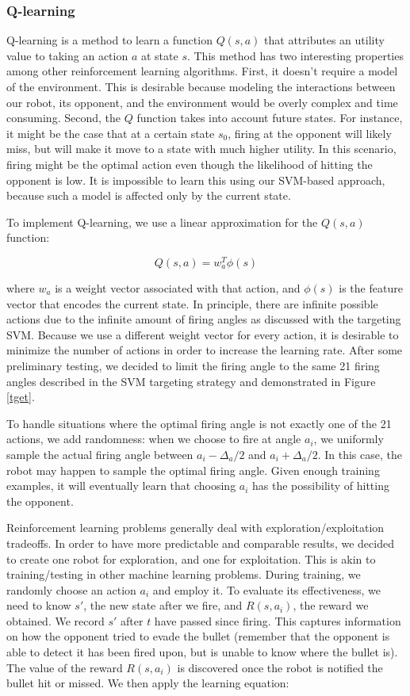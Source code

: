 \documentclass{article}
\theoremstyle{plain}
\theoremstyle{definition}
\theoremstyle{remark}
\begin{document}
\subsubsection*{Q-learning}
Q-learning \cite{watkins92a} is a method to learn a function $Q(s, a)$ that attributes an utility value to taking an action $a$ at state $s$. This method has two interesting properties among other reinforcement learning algorithms. First, it doesn't require a model of the environment. This is desirable because modeling the interactions between our robot, its opponent, and the environment would be overly complex and time consuming. Second, the $Q$ function takes into account future states. For instance, it might be the case that at a certain state $s_0$, firing at the opponent will likely miss, but will make it move to a state with much higher utility. In this scenario, firing might be the optimal action even though the likelihood of hitting the opponent is low. It is impossible to learn this using our SVM-based approach, because such a model is affected only by the current state.

To implement Q-learning, we use a linear approximation for the $Q(s, a)$ function:

$$Q(s, a) = w_a^T\phi(s)$$

where $w_a$ is a weight vector associated with that action, and $\phi(s)$ is the feature vector that encodes the current state. In principle, there are infinite possible actions due to the infinite amount of firing angles as discussed with the targeting SVM. Because we use a different weight vector for every action, it is desirable to minimize the number of actions in order to increase the learning rate. After some preliminary testing, we decided to limit the firing angle to the same 21 firing angles described in the SVM targeting strategy and demonstrated in Figure \ref{tget}.

To handle situations where the optimal firing angle is not exactly one of the 21 actions, we add randomness: when we choose to fire at angle $a_i$, we uniformly sample the actual firing angle between $a_i - \Delta_a/2$ and $a_i + \Delta_a/2$. In this case, the robot may happen to sample the optimal firing angle. Given enough training examples, it will eventually learn that choosing $a_i$ has the possibility of hitting the opponent.

Reinforcement learning problems generally deal with exploration/exploitation tradeoffs. In order to have more predictable and comparable results, we decided to create one robot for exploration, and one for exploitation. This is akin to training/testing in other machine learning problems. During training, we randomly choose an action $a_i$ and employ it. To evaluate its effectiveness, we need to know $s'$, the new state after we fire, and $R(s, a_i)$, the reward we obtained. We record $s'$ after $t$ have passed since firing. This captures information on how the opponent tried to evade the bullet (remember that the opponent is able to detect it has been fired upon, but is unable to know where the bullet is). The value of the reward $R(s, a_i)$ is discovered once the robot is notified the bullet hit or missed. We then apply the learning equation\cite{russelnorvig}:
\end{document}
